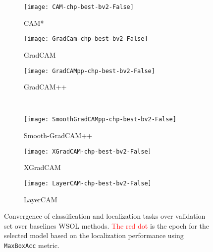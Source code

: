 \documentclass[twocolumn]{article}
\newcommand\maxboxacc{\texttt{MaxBoxAcc}\xspace}
\theoremstyle{definition}
\begin{document}
\begin{figure*}
     \centering
     \begin{subfigure}[b]{0.33\textwidth}
         \centering
         \texttt{[image: CAM-chp-best-bv2-False]}
         \caption{CAM*}
         \label{fig:y equals x}
     \end{subfigure}
     \hfill
     \begin{subfigure}[b]{0.33\textwidth}
         \centering
         \texttt{[image: GradCam-chp-best-bv2-False]}
         \caption{GradCAM}
         \label{fig:three sin x}
     \end{subfigure}
     \hfill
     \begin{subfigure}[b]{0.33\textwidth}
         \centering
         \texttt{[image: GradCAMpp-chp-best-bv2-False]}
         \caption{GradCAM++}
         \label{fig:five over x}
     \end{subfigure}
     \\
     \begin{subfigure}[b]{0.33\textwidth}
         \centering
         \texttt{[image: SmoothGradCAMpp-chp-best-bv2-False]}
         \caption{Smooth-GradCAM++}
         \label{fig:y equals x}
     \end{subfigure}
     \hfill
     \begin{subfigure}[b]{0.33\textwidth}
         \centering
         \texttt{[image: XGradCAM-chp-best-bv2-False]}
         \caption{XGradCAM}
         \label{fig:three sin x}
     \end{subfigure}
     \hfill
     \begin{subfigure}[b]{0.33\textwidth}
         \centering
         \texttt{[image: LayerCAM-chp-best-bv2-False]}
         \caption{LayerCAM}
         \label{fig:five over x}
     \end{subfigure}
        \caption{Convergence of classification and localization tasks over validation set over baselines WSOL methods. \textcolor{red}{The red dot} is the epoch for the selected model based on the localization performance using \maxboxacc metric.}
        \label{fig:convergence-std-wsol}
\end{figure*}
\end{document}
